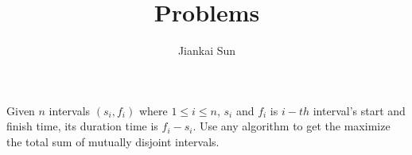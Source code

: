 \documentclass[12pt]{article}
\newenvironment{question}[2][Question]{\begin{trivlist}
\item[\hskip \labelsep {\bfseries #1}\hskip \labelsep {\bfseries #2.}]}{\end{trivlist}}
\begin{document}
 
 
\title{Problems}%
\author{Jiankai Sun\\ %
} %
 
\maketitle


\begin{question}{1}
Given $n$ intervals $(s_i,f_i)$ where $1 \leq i \leq n$, $s_i$ and $f_i$ is $i-th$ interval's start and finish time, its duration time is $f_i-s_i$. Use any algorithm to get the maximize the total sum of mutually disjoint intervals.
\end{question}
\end{document}
